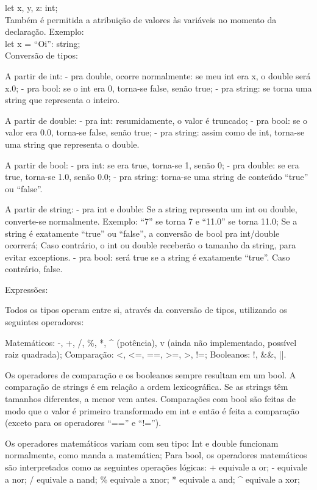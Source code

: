\documentclass[12pt,a4paper]{article}
\begin{document}
let x, y, z: int;\\

Também é permitida a atribuição de valores às variáveis no momento da declaração. Exemplo:\\

let x = ``Oi'': string;\\


Conversão de tipos:

A partir de int:
- pra double, ocorre normalmente: se meu int era x, o double será x.0;
- pra bool: se o int era 0, torna-se false, senão true;
- pra string: se torna uma string que representa o inteiro.

A partir de double:
- pra int: resumidamente, o valor é truncado;
- pra bool: se o valor era 0.0, torna-se false, senão true;
- pra string: assim como de int, torna-se uma string que representa o double.

A partir de bool:
- pra int: se era true, torna-se 1, senão 0;
- pra double: se era true, torna-se 1.0, senão 0.0;
- pra string: torna-se uma string de conteúdo ``true'' ou ``false''.

A partir de string:
- pra int e double:
Se a string representa um int ou double, converte-se normalmente. Exemplo: ``7'' se torna 7 e ``11.0'' se torna 11.0;
Se a string é exatamente ``true'' ou ``false'', a conversão de bool pra int/double ocorrerá;
Caso contrário, o int ou double receberão o tamanho da string, para evitar exceptions.
- pra bool: será true se a string é exatamente ``true''. Caso contrário, false.


Expressões:

Todos os tipos operam entre si, através da conversão de tipos, utilizando os seguintes operadores:

Matemáticos: -, +, /, \%, *, ^ (potência), v (ainda não implementado, possível raiz quadrada);
Comparação: <, <=, ==, >=, >, !=;
Booleanos: !, &&, ||.

Os operadores de comparação e os booleanos sempre resultam em um bool. A comparação de strings é em relação a ordem lexicográfica. Se as strings têm tamanhos diferentes, a menor vem antes. Comparações com bool são feitas de modo que o valor é primeiro transformado em int e então é feita a comparação (exceto para os operadores ``=='' e ``!='').

Os operadores matemáticos variam com seu tipo:
Int e double funcionam normalmente, como manda a matemática;
Para bool, os operadores matemáticos são interpretados como as seguintes operações lógicas:
+ equivale a or;
- equivale a nor;
/ equivale a nand;
\% equivale a xnor;
* equivale a and;
^ equivale a xor;
\end{document}
